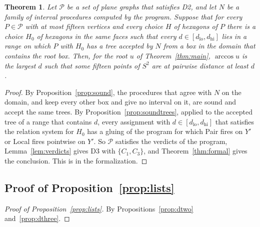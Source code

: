 \documentclass[12pt]{amsart}
\newtheorem{theorem}{Theorem}[section]
\theoremstyle{definition}
\theoremstyle{plain}
\theoremstyle{definition}
\newcommand{\Sph}{S^2}
\newcommand{\dlo}{d_{\mathrm{lo}}}
\newcommand{\dhi}{d_{\mathrm{hi}}}
\newcommand{\CI}{C_1}
\newcommand{\CIII}{C_3}
\newcommand{\leanmap}[1]{\ignorespaces}
\newcommand{\mapnote}[1]{\ignorespaces}
\begin{document}
\begin{theorem}\label{thm:trees}\leanmap{Tammes15.conjecture_of_enum_progTreesDom, Tammes15.Contractors.ProgTreesDom, Tammes15.Contractors.Impl, Tammes15.Contractors.killed_of_progTreesDom, Tammes15.conjecture_of_enum_progTrees, Tammes15.PaperSteps.ProgTrees, Tammes15.PaperSteps.progKilled_of_progTrees, Tammes15.conjecture_of_enum_progKilled}\mapnote{the conclusion is \texttt{Tammes15.Conjecture}, the formal statement of Theorem \ref{thm:main}; the family of procedures is a parameter of the statement; the fourth declaration gives D3 with $\{C_1,C_3\}$ from the same hypotheses; the fifth is the conclusion from D2, any sound family of procedures and its accepted trees}
Let $\mathcal P$ be a set of plane graphs that satisfies D2, and let $N$ be a family of interval procedures computed by the program. Suppose that for every $P\in \mathcal P$ with at most fifteen vertices and every choice $H$ of hexagons of $P$ there is a choice $H_0$ of hexagons in the same faces such that every $d\in[\dlo,\dhi]$ lies in a range on which $P$ with $H_0$ has a tree accepted by $N$ from a box in the domain that contains the root box. Then, for the root $u$ of Theorem~\ref{thm:main}, $\arccos u$ is the largest $d$ such that some fifteen points of $\Sph$ are at pairwise distance at least $d$.
\end{theorem}

\begin{proof}
By Proposition~\ref{prop:sound}, the procedures that agree with $N$ on the domain, and keep every other box and give no interval on it, are sound and accept the same trees. By Proposition~\ref{prop:soundtrees}, applied to the accepted tree of a range that contains $d$, every assignment with $d\in[\dlo,\dhi]$ that satisfies the relation system for $H_0$ has a gluing of the program for which Pair fires on $Y'$ or Local fires pointwise on $Y'$. So $\mathcal P$ satisfies the verdicts of the program, Lemma~\ref{lem:verdicts} gives D3 with $\{\CI,\CIII\}$, and Theorem~\ref{thm:formal} gives the conclusion. This is  in the formalization.
\end{proof}

\subsection{Proof of Proposition~\ref{prop:lists}}
\begin{proof}[Proof of Proposition~\ref{prop:lists}]
By Propositions~\ref{prop:dtwo} and~\ref{prop:dthree}.
\end{proof}
\end{document}
